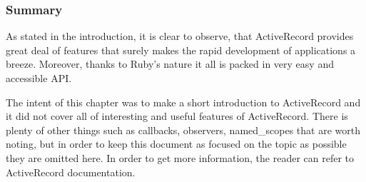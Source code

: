       \subsubsection{Summary}
      As stated in the introduction, it is clear to observe, that ActiveRecord provides great deal
      of features that surely makes the rapid development of applications a breeze. Moreover, thanks
      to Ruby's nature it all is packed in very easy and accessible API.

      The intent of this chapter was to make a short introduction to ActiveRecord and it did not cover
      all of interesting and useful features of ActiveRecord. There is plenty of other things such as
      callbacks, observers, named\_scopes that are worth noting, but in order to keep
      this document as focused on the topic as possible they are omitted here. In order to get more
      information, the reader can refer to ActiveRecord documentation.

